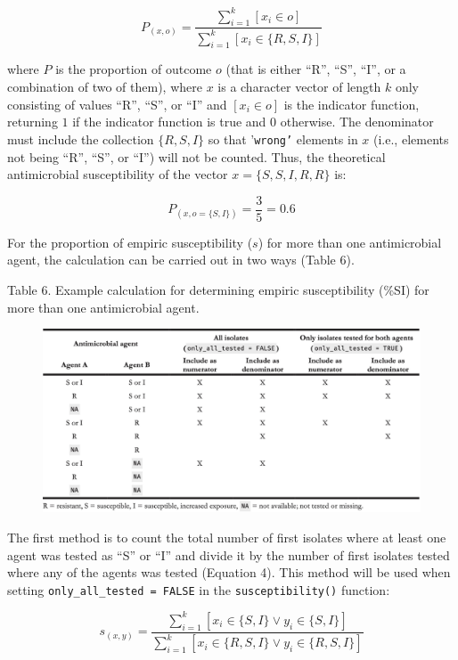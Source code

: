 \documentclass[
]{book}
\begin{document}
\[P_{(x, o)} = \frac{\sum_{i=1}^k [x_i \in o]}{\sum_{i=1}^k [x_i \in \{R,S,I\}]}\]

where \(P\) is the proportion of outcome \(o\) (that is either ``R'', ``S'', ``I'', or a combination of two of them), where \(x\) is a character vector of length \(k\) only consisting of values ``R'', ``S'', or ``I'' and \([x_i \in o]\) is the indicator function, returning \(1\) if the indicator function is true and \(0\) otherwise. The denominator must include the collection \(\{R,S,I\}\) so that '\texttt{wrong’} elements in \(x\) (i.e., elements not being ``R'', ``S'', or ``I'') will not be counted. Thus, the theoretical antimicrobial susceptibility of the vector \(x = \{S,S,I,R,R\}\) is:

\[P_{(x, o = \{S, I\})} = \frac{3}{5} = 0.6\]

For the proportion of empiric susceptibility (\(s\)) for more than one antimicrobial agent, the calculation can be carried out in two ways (Table 6).

Table 6. Example calculation for determining empiric susceptibility (\%SI) for more than one antimicrobial agent.

\begin{figure}

{\centering \includegraphics[width=1\linewidth]{images/04-t06} 

}

\end{figure}

The first method is to count the total number of first isolates where at least one agent was tested as ``S'' or ``I'' and divide it by the number of first isolates tested where any of the agents was tested (Equation 4). This method will be used when setting \texttt{only\_all\_tested\ =\ FALSE} in the \texttt{susceptibility()} function:

\[s_{(x, y)} = \frac{\sum_{i=1}^k [x_i \in \{S,I\} \lor y_i \in \{S,I\}]}{\sum_{i=1}^k [x_i \in \{R,S,I\} \lor y_i \in \{R,S,I\}]}\]
\end{document}

